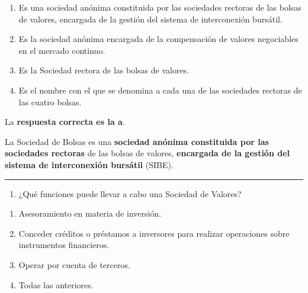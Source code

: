 \documentclass[
  letterpaper,
  DIV=11,
  numbers=noendperiod]{scrreprt}
\providecommand{\tightlist}{%
  \setlength{\itemsep}{0pt}\setlength{\parskip}{0pt}}\usepackage{longtable,booktabs,array}
\begin{document}
\begin{enumerate}
\def\labelenumi{\alph{enumi}.}
\item
  Es una sociedad anónima constituida por las sociedades rectoras de las
  bolsas de valores, encargada de la gestión del sistema de
  interconexión bursátil.
\item
  Es la sociedad anónima encargada de la compensación de valores
  negociables en el mercado continuo.
\item
  Es la Sociedad rectora de las bolsas de valores.
\item
  Es el nombre con el que se denomina a cada una de las sociedades
  rectoras de las cuatro bolsas.
\end{enumerate}

\begin{tcolorbox}[enhanced jigsaw, left=2mm, opacityback=0, colback=white, breakable, arc=.35mm, bottomrule=.15mm, rightrule=.15mm, toprule=.15mm, leftrule=.75mm, colframe=quarto-callout-tip-color-frame]
\begin{minipage}[t]{5.5mm}
\textcolor{quarto-callout-tip-color}{\faLightbulb}
\end{minipage}%
\begin{minipage}[t]{\textwidth - 5.5mm}

La \textbf{respuesta correcta es la a}.

La Sociedad de Bolsas es una \textbf{sociedad anónima constituida por
las sociedades rectoras} de las bolsas de valores, \textbf{encargada de
la gestión del sistema de interconexión bursátil} (SIBE).

\end{minipage}%
\end{tcolorbox}

\begin{center}\rule{0.5\linewidth}{0.5pt}\end{center}

\begin{enumerate}
\def\labelenumi{\arabic{enumi}.}
\setcounter{enumi}{68}
\tightlist
\item
  ¿Qué funciones puede llevar a cabo una Sociedad de Valores?
\end{enumerate}

\begin{enumerate}
\def\labelenumi{\alph{enumi}.}
\item
  Asesoramiento en materia de inversión.
\item
  Conceder créditos o préstamos a inversores para realizar operaciones
  sobre instrumentos financieros.
\item
  Operar por cuenta de terceros.
\item
  Todas las anteriores.
\end{enumerate}
\end{document}
